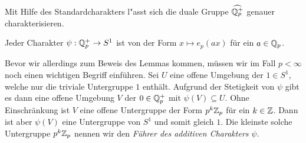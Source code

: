 		Mit Hilfe des Standardcharakters l"asst sich die duale Gruppe $\widehat{\mathbb{Q}_p^+}$ genauer charakterisieren.
		\begin{lemma}\label{lemma:lokal:genericchar}
			Jeder Charakter $\psi: \mathbb{Q}_p^+ \to S^1$ ist von der Form $x \mapsto e_p(ax)$ für ein $a \in {\mathbb{Q}_p}$.
		\end{lemma}
		Bevor wir allerdings zum Beweis des Lemmas kommen, müssen wir im Fall $p<\infty$ noch einen wichtigen Begriff einführen.
		Sei $U$ eine offene Umgebung der $1 \in S^1$, welche nur die triviale Untergruppe $1$ enthält. 
		Aufgrund der Stetigkeit von $\psi$ gibt es dann eine offene Umgebung $V$ der $0\in\mathbb{Q}_p^+$ mit $\psi(V)\subseteq U$. 
		Ohne Einschränkung ist $V$ eine offene Untergruppe der Form $p^k{\mathbb{Z}_p}$ für ein $k\in\mathbb{Z}$. 
		Dann ist aber $\psi(V)$ eine Untergruppe von $S^1$ und somit gleich $1$.
		Die kleinste solche Untergruppe $p^k{\mathbb{Z}_p}$ nennen wir den \emph{Führer des additiven Charakters $\psi$}.
